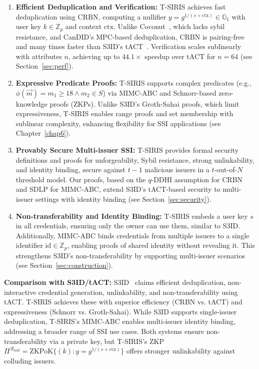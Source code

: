 \begin{enumerate}
    \item \textbf{Efficient Deduplication and Verification:} T-SIRIS achieves fast deduplication using CRBN, computing a nullifier $y = g^{1/(s + \text{ctx})} \in \mathbb{G}_1$ with user key $k \in \mathbb{Z}_p$ and context $\text{ctx}$. Unlike Coconut~\cite{sonnino_coconut_2020}, which lacks sybil resistance, and CanDID’s MPC-based deduplication, CRBN is pairing-free and many times faster than S3ID’s tACT~\cite{rabaninejad_attribute-based_2024}. Verification scales sublinearly with attributes $n$, achieving up to $44.1\times$ speedup over tACT for $n=64$ (see Section~\ref{sec:perf}).
    
    \item \textbf{Expressive Predicate Proofs:} T-SIRIS supports complex predicates (e.g., $\phi(\vec{m}) = m_1 \geq 18 \wedge m_2 \in S$) via MIMC-ABC and Schnorr-based zero-knowledge proofs (ZKPs). Unlike S3ID’s Groth-Sahai proofs, which limit expressiveness, T-SIRIS enables range proofs and set membership with sublinear complexity, enhancing flexibility for SSI applications (see Chapter~\ref{chap6}).
    
    \item \textbf{Provably Secure Multi-issuer SSI:} T-SIRIS provides formal security definitions and proofs for unforgeability, Sybil resistance, strong unlinkability, and identity binding, secure against $t-1$ malicious issuers in a $t$-out-of-$N$ threshold model. Our proofs, based on the $q$-DDHI assumption for CRBN and SDLP for MIMC-ABC, extend S3ID’s tACT-based security to multi-issuer settings with identity binding (see Section~\ref{sec:security}).
    
    \item \textbf{Non-transferability and Identity Binding:} T-SIRIS embeds a user key $s$ in all credentials, ensuring only the owner can use them, similar to S3ID. Additionally, MIMC-ABC binds credentials from multiple issuers to a single identifier $\text{id} \in \mathbb{Z}_p$, enabling proofs of shared identity without revealing it. This strengthens S3ID’s non-transferability by supporting multi-issuer scenarios (see Section~\ref{sec:construction}).
\end{enumerate}

\textbf{Comparison with S3ID/tACT:} S3ID~\cite{rabaninejad_attribute-based_2024} claims efficient deduplication, non-interactive credential generation, unlinkability, and non-transferability using tACT. T-SIRIS achieves these with superior efficiency (CRBN vs. tACT) and expressiveness (Schnorr vs. Groth-Sahai). While S3ID supports single-issuer deduplication, T-SIRIS’s MIMC-ABC enables multi-issuer identity binding, addressing a broader range of SSI use cases. Both systems ensure non-transferability via a private key, but T-SIRIS’s ZKP $\Pi^{\mathcal{R}_{\text{null}}} = \text{ZKPoK}\{(k): y = g^{1/(s + \text{ctx})}\}$ offers stronger unlinkability against colluding issuers.


